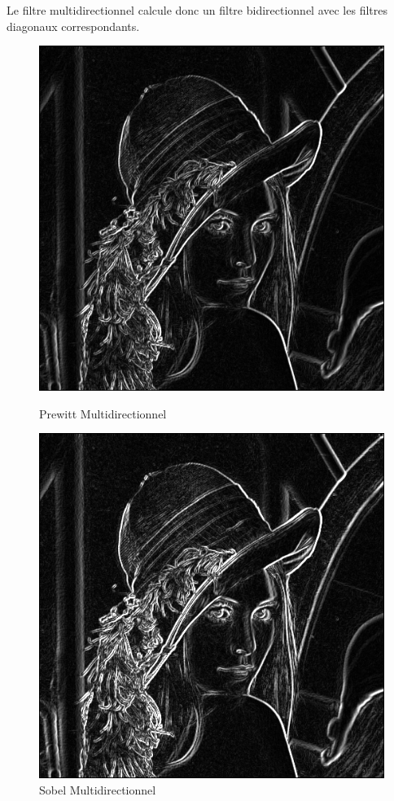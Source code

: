 \documentclass[11pt]{article}
\begin{document}
	Le filtre multidirectionnel calcule donc un filtre bidirectionnel avec les filtres diagonaux correspondants.

	\begin{figure}[H]
		\begin{minipage}[c]{.46\linewidth}
			\centering
			\includegraphics[scale=0.25]{Image/filtrePrewittMultidirectionnel.png}
			\caption{Prewitt Multidirectionnel}
			\label{fig:PrewittMultidirectionnel}
		\end{minipage} \hfill
		\begin{minipage}[c]{.46\linewidth}
		\centering
			\includegraphics[scale=0.25]{Image/filtreSobelMultidirectionnel.png}
			\caption{Sobel Multidirectionnel}
			\label{fig:SobelMultidirectionnel}
		\end{minipage}
	\end{figure}
\end{document}
